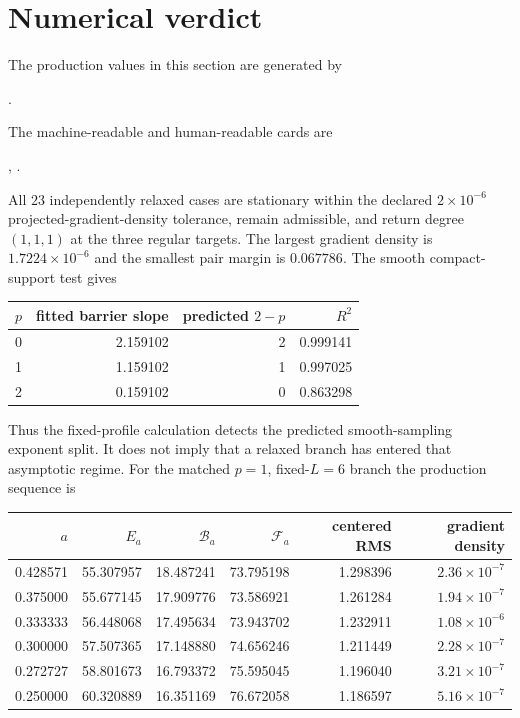 \documentclass[11pt]{article}
\numberwithin{equation}{section}
\theoremstyle{definition}
\theoremstyle{remark}
\newcommand{\cB}{\mathcal B}
\newcommand{\cF}{\mathcal F}
\begin{document}
\section{Numerical verdict}

The production values in this section are generated by

\begin{center}
.
\end{center}

The machine-readable and human-readable cards are

\begin{center}
,\qquad
{}.
\end{center}

All $23$ independently relaxed cases are stationary within the declared
$2\times10^{-6}$ projected-gradient-density tolerance, remain admissible,
and return degree $(1,1,1)$ at the three regular targets.  The largest
gradient density is $1.7224\times10^{-6}$ and the smallest pair margin is
$0.067786$.  The smooth compact-support test gives

\begin{center}
\begin{tabular}{rrrr}
\toprule
$p$&fitted barrier slope&predicted $2-p$&$R^2$\\
\midrule
0&2.159102&2&0.999141\\
1&1.159102&1&0.997025\\
2&0.159102&0&0.863298\\
\bottomrule
\end{tabular}
\end{center}

Thus the fixed-profile calculation detects the predicted smooth-sampling
exponent split.  It
does not imply that a relaxed branch has entered that asymptotic regime.
For the matched $p=1$, fixed-$L=6$ branch the production sequence is

\begin{center}
\small
\begin{tabular}{rrrrrr}
\toprule
$a$&$E_a$&$\cB_a$&$\cF_a$&centered RMS&gradient density\\
\midrule
0.428571&55.307957&18.487241&73.795198&1.298396&$2.36\times10^{-7}$\\
0.375000&55.677145&17.909776&73.586921&1.261284&$1.94\times10^{-7}$\\
0.333333&56.448068&17.495634&73.943702&1.232911&$1.08\times10^{-6}$\\
0.300000&57.507365&17.148880&74.656246&1.211449&$2.28\times10^{-7}$\\
0.272727&58.801673&16.793372&75.595045&1.196040&$3.21\times10^{-7}$\\
0.250000&60.320889&16.351169&76.672058&1.186597&$5.16\times10^{-7}$\\
\bottomrule
\end{tabular}
\end{center}
\end{document}
